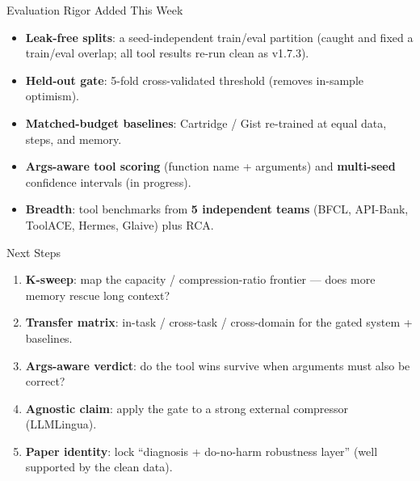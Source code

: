 \begin{frame}{Evaluation Rigor Added This Week}
  \begin{itemize}
    \item \textbf{Leak-free splits}: a seed-independent train/eval partition (caught and fixed a
      train/eval overlap; all tool results re-run clean as v1.7.3).
    \item \textbf{Held-out gate}: 5-fold cross-validated threshold (removes in-sample optimism).
    \item \textbf{Matched-budget baselines}: Cartridge / Gist re-trained at equal data, steps, and memory.
    \item \textbf{Args-aware tool scoring} (function name + arguments) and \textbf{multi-seed} confidence intervals (in progress).
    \item \textbf{Breadth}: tool benchmarks from \textbf{5 independent teams}
      (BFCL, API-Bank, ToolACE, Hermes, Glaive) plus RCA.
  \end{itemize}
\end{frame}

\begin{frame}{Next Steps}
  \begin{enumerate}
    \item \textbf{K-sweep}: map the capacity / compression-ratio frontier --- does more memory rescue long context?
    \item \textbf{Transfer matrix}: in-task / cross-task / cross-domain for the gated system + baselines.
    \item \textbf{Args-aware verdict}: do the tool wins survive when arguments must also be correct?
    \item \textbf{Agnostic claim}: apply the gate to a strong external compressor (LLMLingua).
    \item \textbf{Paper identity}: lock ``diagnosis + do-no-harm robustness layer'' (well supported by the clean data).
  \end{enumerate}
\end{frame}

